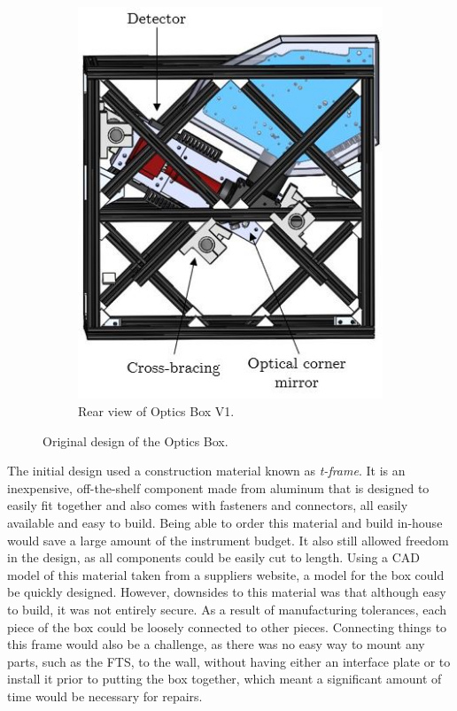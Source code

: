 \begin{figure}
\begin{subfigure}[h]{0.42\textwidth}
        \includegraphics[width=\textwidth]{chap3_images/LIFE_V1_images/Optics_Box_V1_V0_rear_view_labelled.JPG}
        \caption{Rear view of Optics Box V1.}
        \label{fig:OB_V1_rear}
    \end{subfigure}
    \caption{Original design of the Optics Box.}
    \label{fig:OB_V1}
\end{figure}

The initial design used a construction material known as \textit{t-frame}. It is an inexpensive, off-the-shelf component made from aluminum that is designed to easily fit together and also comes with fasteners and connectors, all easily available and easy to build. Being able to order this material and build in-house would save a large amount of the instrument budget. It also still allowed freedom in the design, as all components could be easily cut to length. Using a CAD model of this material taken from a suppliers website, a model for the box could be quickly designed. However, downsides to this material was that although easy to build, it was not entirely secure. As a result of manufacturing tolerances, each piece of the box could be loosely connected to other pieces. Connecting things to this frame would also be a challenge, as there was no easy way to mount any parts, such as the FTS, to the wall, without having either an interface plate or to install it prior to putting the box together, which meant a significant amount of time would be necessary for repairs.

